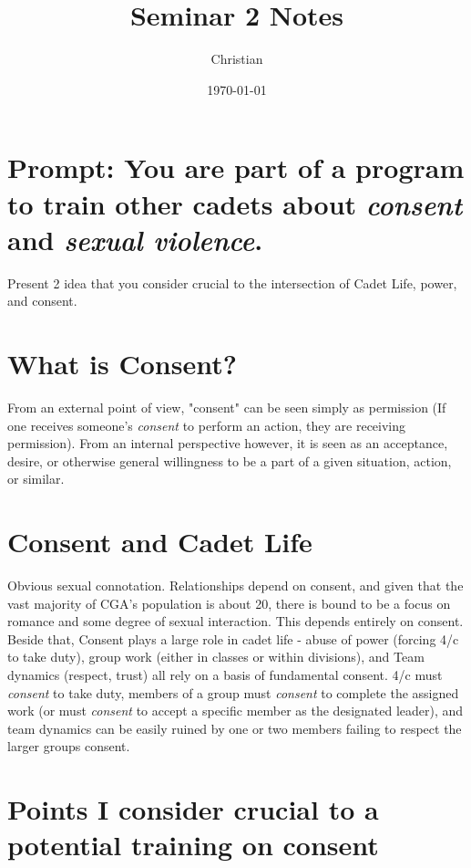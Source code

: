 \documentclass[11pt]{article}
\author{Christian}
\date{\today}
\title{Seminar 2 Notes}
\begin{document}
\maketitle
\tableofcontents



\section{Prompt: You are part of a program to train other cadets about \emph{consent} and \emph{sexual violence}.}
\label{sec:org94118d4}
Present 2 idea that you consider crucial to the intersection of Cadet Life, power, and consent.

\section{What is Consent?}
\label{sec:org53bfa06}

From an external point of view, "consent" can be seen simply as permission (If one receives someone's \emph{consent} to perform an action, they are receiving permission).
From an internal perspective however, it is seen as an acceptance, desire, or otherwise general willingness to be a part of a given situation, action, or similar. 

\section{Consent and Cadet Life}
\label{sec:orgd06ff5d}
Obvious sexual connotation. Relationships depend on consent, and given that the vast majority of CGA's population is about 20, there is bound to be a focus on romance and some degree of sexual interaction. This depends entirely on consent.
Beside that, Consent plays a large role in cadet life - abuse of power (forcing 4/c to take duty), group work (either in classes or within divisions), and Team dynamics (respect, trust) all rely on a basis of fundamental consent. 4/c must \emph{consent} to take duty, members of a group must \emph{consent} to complete the assigned work (or must \emph{consent} to accept a specific member as the designated leader), and team dynamics can be easily ruined by one or two members failing to respect the larger groups consent.

\section{Points I consider crucial to a potential training on consent}
\label{sec:org7fc004d}
\end{document}
